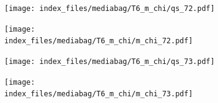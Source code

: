 \documentclass[
  11pt,
  letterpaper,
]{scrreprt}
\begin{document}
\begin{figure}

\begin{minipage}{0.50\linewidth}

\begin{figure}[H]

{\centering \texttt{[image: index\_files/mediabag/T6\_m\_chi/qs\_72.pdf]}

}


\end{figure}%

\end{minipage}%
%
\begin{minipage}{0.50\linewidth}

\begin{figure}[H]

{\centering \texttt{[image: index\_files/mediabag/T6\_m\_chi/m\_chi\_72.pdf]}

}


\end{figure}%

\end{minipage}%

\end{figure}%

\begin{figure}

\begin{minipage}{0.50\linewidth}

\begin{figure}[H]

{\centering \texttt{[image: index\_files/mediabag/T6\_m\_chi/qs\_73.pdf]}

}


\end{figure}%

\end{minipage}%
%
\begin{minipage}{0.50\linewidth}

\begin{figure}[H]

{\centering \texttt{[image: index\_files/mediabag/T6\_m\_chi/m\_chi\_73.pdf]}

}


\end{figure}%

\end{minipage}%

\end{figure}%
\end{document}
